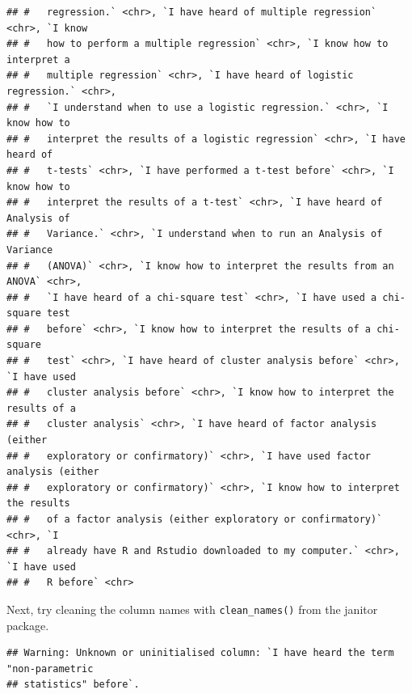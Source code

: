 \documentclass[
]{book}
\newenvironment{Shaded}{\begin{snugshade}}{\end{snugshade}}
\newcommand{\CommentTok}[1]{\textcolor[rgb]{0.56,0.35,0.01}{\textit{#1}}}
\newcommand{\DataTypeTok}[1]{\textcolor[rgb]{0.13,0.29,0.53}{#1}}
\newcommand{\KeywordTok}[1]{\textcolor[rgb]{0.13,0.29,0.53}{\textbf{#1}}}
\newcommand{\NormalTok}[1]{#1}
\newcommand{\OperatorTok}[1]{\textcolor[rgb]{0.81,0.36,0.00}{\textbf{#1}}}
\newcommand{\StringTok}[1]{\textcolor[rgb]{0.31,0.60,0.02}{#1}}
\begin{document}
\begin{verbatim}
## #   regression.` <chr>, `I have heard of multiple regression` <chr>, `I know
## #   how to perform a multiple regression` <chr>, `I know how to interpret a
## #   multiple regression` <chr>, `I have heard of logistic regression.` <chr>,
## #   `I understand when to use a logistic regression.` <chr>, `I know how to
## #   interpret the results of a logistic regression` <chr>, `I have heard of
## #   t-tests` <chr>, `I have performed a t-test before` <chr>, `I know how to
## #   interpret the results of a t-test` <chr>, `I have heard of Analysis of
## #   Variance.` <chr>, `I understand when to run an Analysis of Variance
## #   (ANOVA)` <chr>, `I know how to interpret the results from an ANOVA` <chr>,
## #   `I have heard of a chi-square test` <chr>, `I have used a chi-square test
## #   before` <chr>, `I know how to interpret the results of a chi-square
## #   test` <chr>, `I have heard of cluster analysis before` <chr>, `I have used
## #   cluster analysis before` <chr>, `I know how to interpret the results of a
## #   cluster analysis` <chr>, `I have heard of factor analysis (either
## #   exploratory or confirmatory)` <chr>, `I have used factor analysis (either
## #   exploratory or confirmatory)` <chr>, `I know how to interpret the results
## #   of a factor analysis (either exploratory or confirmatory)` <chr>, `I
## #   already have R and Rstudio downloaded to my computer.` <chr>, `I have used
## #   R before` <chr>
\end{verbatim}

Next, try cleaning the column names with \texttt{clean\_names()} from the janitor package.

\begin{Shaded}
\end{Shaded}

\begin{verbatim}
## Warning: Unknown or uninitialised column: `I have heard the term "non-parametric
## statistics" before`.
\end{verbatim}
\end{document}
